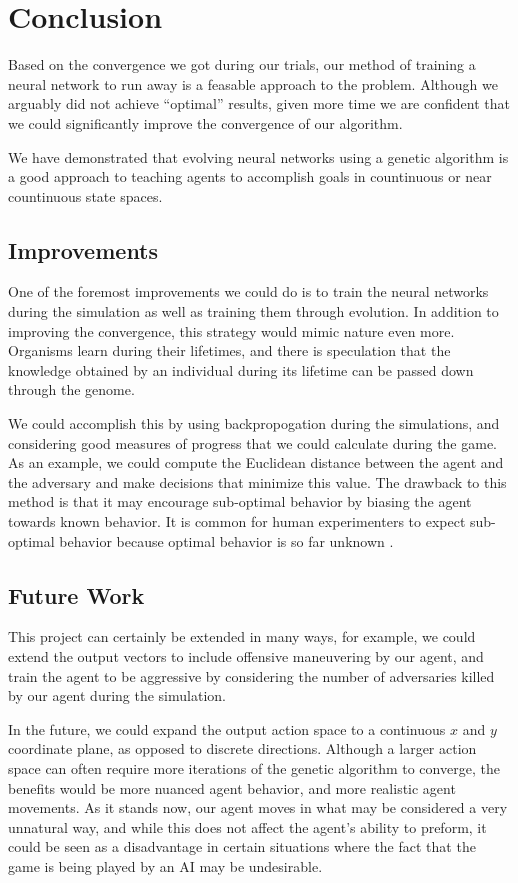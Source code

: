 \documentclass{article}
\begin{document}
\section{Conclusion}
Based on the convergence we got during our trials, our method of training a
neural network to run away is a feasable approach to the problem. Although we
arguably did not achieve ``optimal'' results, given more time we are confident
that we could significantly improve the convergence of our algorithm.

We have demonstrated that evolving neural networks using a genetic algorithm is
a good approach to teaching agents to accomplish goals in countinuous or near
countinuous state spaces.  

\subsection{Improvements}\label{sec:improvements}
One of the foremost improvements we could do is to train the neural networks
during the simulation as well as training them through evolution. In addition to
improving the convergence, this strategy would mimic nature even more.
Organisms learn during their lifetimes, and there is speculation that the
knowledge obtained by an individual during its lifetime can be passed down
through the genome.

We could accomplish this by using backpropogation during the simulations, and
considering good measures of progress that we could calculate during the
game. As an example, we could compute the Euclidean distance between the agent
and the adversary and make decisions that minimize this value. The drawback to
this method is that it may encourage sub-optimal behavior by biasing the agent
towards known behavior. It is common for human experimenters to expect
sub-optimal behavior because optimal behavior is so far unknown \cite{lehman}.

\subsection{Future Work}
This project can certainly be extended in many ways, for example, we could
extend the output vectors to include offensive maneuvering by our agent, and
train the agent to be aggressive by considering the number of adversaries killed
by our agent during the simulation.

In the future, we could expand the output action space to a continuous $x$ and
$y$ coordinate plane, as opposed to discrete directions. Although a larger
action space can often require more iterations of the genetic algorithm to
converge, the benefits would be more nuanced agent behavior, and more realistic
agent movements. As it stands now, our agent moves in what may be considered a
very unnatural way, and while this does not affect the agent's ability to
preform, it could be seen as a disadvantage in certain situations where the fact
that the game is being played by an AI may be undesirable.
\end{document}
